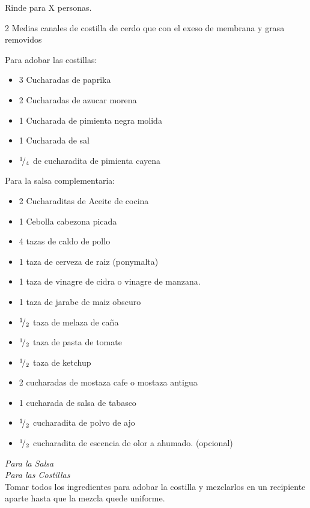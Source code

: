 
Rinde para X personas.


\begin{ingredientes}
\item 2 Medias canales de costilla de cerdo que con el exeso de membrana y grasa removidos
\item Para adobar las costillas:
\begin{itemize}
\item 3 Cucharadas de paprika
\item 2 Cucharadas de azucar morena
\item 1 Cucharada de pimienta negra molida
\item 1 Cucharada de sal
\item ${}^{1}\!/_{4}$ de cucharadita de pimienta cayena
\end{itemize}
\item Para la salsa complementaria:
\begin{itemize}
\item 2 Cucharaditas de Aceite de cocina
\item 1 Cebolla cabezona picada
\item 4 tazas de caldo de pollo
\item 1 taza de cerveza de raiz (ponymalta)
\item 1 taza de vinagre de cidra o vinagre de manzana.
\item 1 taza de jarabe de maiz obscuro
\item ${}^{1}\!/_{2}$ taza de melaza de caña
\item ${}^{1}\!/_{2}$ taza de pasta de tomate
\item ${}^{1}\!/_{2}$ taza de ketchup
\item 2 cucharadas de mostaza cafe o mostaza antigua
\item 1 cucharada de salsa de tabasco
\item ${}^{1}\!/_{2}$ cucharadita de polvo de ajo
\item ${}^{1}\!/_{2}$ cucharadita de escencia de olor a ahumado. (opcional)
\end{itemize}
\end{ingredientes}
\preparacion

\emph{Para la Salsa}\\


\emph{Para las Costillas}\\

Tomar todos los ingredientes para adobar la costilla y mezclarlos en un recipiente aparte hasta que la mezcla quede uniforme.\\


